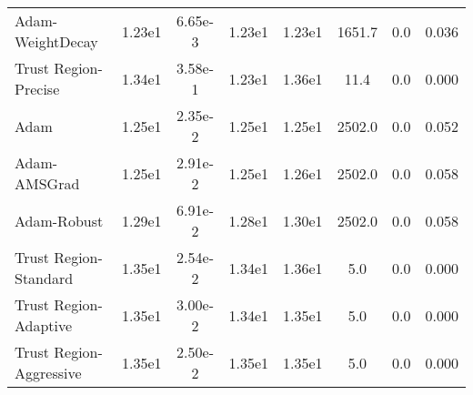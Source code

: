 \documentclass{article}
\begin{document}
\begin{table}[htbp]
{\begin{tabular}{p{2.5cm}*{7}{c}}
Adam-WeightDecay & 1.23e1 & 6.65e-3 & 1.23e1 & 1.23e1 & 1651.7 & 0.0 & 0.036 \\
Trust Region-Precise & 1.34e1 & 3.58e-1 & 1.23e1 & 1.36e1 & 11.4 & 0.0 & 0.000 \\
Adam & 1.25e1 & 2.35e-2 & 1.25e1 & 1.25e1 & 2502.0 & 0.0 & 0.052 \\
Adam-AMSGrad & 1.25e1 & 2.91e-2 & 1.25e1 & 1.26e1 & 2502.0 & 0.0 & 0.058 \\
Adam-Robust & 1.29e1 & 6.91e-2 & 1.28e1 & 1.30e1 & 2502.0 & 0.0 & 0.058 \\
Trust Region-Standard & 1.35e1 & 2.54e-2 & 1.34e1 & 1.36e1 & 5.0 & 0.0 & 0.000 \\
Trust Region-Adaptive & 1.35e1 & 3.00e-2 & 1.34e1 & 1.35e1 & 5.0 & 0.0 & 0.000 \\
Trust Region-Aggressive & 1.35e1 & 2.50e-2 & 1.35e1 & 1.35e1 & 5.0 & 0.0 & 0.000 \\
\bottomrule
\end{tabular}
}
\end{table}
\end{document}
